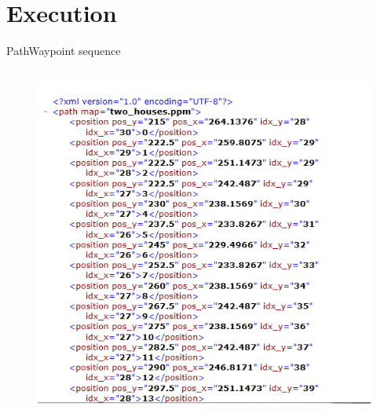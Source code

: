 \section{Execution}

\begin{frame}{Path}{Waypoint sequence}

\begin{columns}
\begin{figure}
\centering
\includegraphics[width = \textwidth]{./screenshot/planned_path.png}
\end{figure}

\begin{minipage}{\textwidth}
\end{minipage}
\end{columns}

\end{frame}


